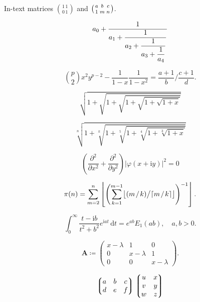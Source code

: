 \documentclass[12pt, a4paper, oneside]{article}
\newcommand{\mathup}[1]{\mathrm{#1}}
\newcommand*{\divslash}{%
	\mathbin{%
		\nonscript\mskip-2mu / \nonscript\mskip-2mu%
	}%
}  %
\theoremstyle{Plain}
\theoremstyle{Definition}
\theoremstyle{Remark}
\begin{document}
\begin{appendix}

\noindent In-text matrices $\binom{1\,1}{0\,1}$ and $\bigl(\genfrac{}{}{0pt}{}{a}{1}\genfrac{}{}{0pt}{}{b}{m}\genfrac{}{}{0pt}{}{c}{n}\bigr)$.


$$a_0+\frac1{\displaystyle a_1 +
	{\strut \frac1{\displaystyle a_2 +
			{\strut \frac1{\displaystyle a_3 +
					{\strut \frac1{\displaystyle a_4}}}}}}}$$


$$\binom{p}{2}x^2y^{p-2} - \frac1{1 - x}\frac{1}{1 - x^2}
=
\frac{a+1}{b}\bigg/\frac{c+1}{d}.$$


$$\sqrt{1+\sqrt{1+\sqrt{1+\sqrt{1+\sqrt{1+x}}}}}$$

$$\sqrt[n]{1+\sqrt[k]{1+\sqrt[5]{1+\sqrt[4]{1+\sqrt[3]{1+x}}}}}$$


$$\left(\frac{\partial^2}{\partial x^2} + \frac{\partial^2}{\partial y^2}\right)
\bigl|\varphi(x+\mathup{i}y)\bigr|^2=0$$



$$\pi(n)=\sum_{m=2}^n\left\lfloor\Biggl(\sum_{k=1}^{m-1}\bigl
\lfloor(m \divslash k) \big/ \lceil m \divslash k\rceil\bigr\rfloor\Biggr)^{-1}\right\rfloor.$$


$$\int_0^\infty \frac{t - \mathup{i} b}{t^2 + b^2}e^{\mathup{i}at}\,\mathup{d}t=e^{ab}E_1(ab), \quad
a,b > 0.$$


$$\mathbf{A} \coloneq \begin{pmatrix}x-\lambda&1&0\\
0&x-\lambda&1\\
0&0&x-\lambda\end{pmatrix}.$$

$$\left\lgroup\begin{matrix}a&b&c\\ d&e&f\\\end{matrix}\right\rgroup
\left\lgroup\begin{matrix}u&x\cr v&y\cr w&z\end{matrix}\right\rgroup$$



\end{appendix}
\end{document}
